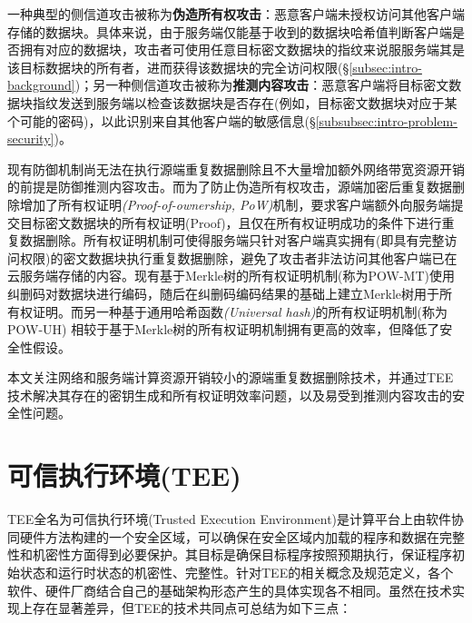 一种典型的侧信道攻击被称为\textbf{伪造所有权攻击}：恶意客户端未授权访问其他客户端存储的数据块\cite{harnik2010side,mulazzani11}。具体来说，由于服务端仅能基于收到的数据块哈希值判断客户端是否拥有对应的数据块，攻击者可使用任意目标密文数据块的指纹来说服服务端其是该目标数据块的所有者，进而获得该数据块的完全访问权限(\S\ref{subsec:intro-background})；另一种侧信道攻击被称为\textbf{推测内容攻击}：恶意客户端将目标密文数据块指纹发送到服务端以检查该数据块是否存在(例如，目标密文数据块对应于某个可能的密码\cite{harnik2010side})，以此识别来自其他客户端的敏感信息(\S\ref{subsubsec:intro-problem-security})。

现有防御机制尚无法在执行源端重复数据删除且不大量增加额外网络带宽资源开销的前提是防御推测内容攻击。而为了防止伪造所有权攻击，源端加密后重复数据删除增加了所有权证明\textit{(Proof-of-ownership, PoW)}机制\cite{halevi11}，要求客户端额外向服务端提交目标密文数据块的所有权证明(Proof)，且仅在所有权证明成功的条件下进行重复数据删除。所有权证明机制可使得服务端只针对客户端真实拥有(即具有完整访问权限)的密文数据块执行重复数据删除，避免了攻击者非法访问其他客户端已在云服务端存储的内容。现有基于Merkle树的所有权证明机制(称为POW-MT)\cite{xu2013weak}使用纠删码对数据块进行编码，随后在纠删码编码结果的基础上建立Merkle树用于所有权证明。而另一种基于通用哈希函数\textit{(Universal hash)}的所有权证明机制(称为POW-UH)\cite{halevi2011proofs} 相较于基于Merkle树的所有权证明机制拥有更高的效率，但降低了安全性假设。

本文关注网络和服务端计算资源开销较小的源端重复数据删除技术，并通过TEE技术解决其存在的密钥生成和所有权证明效率问题，以及易受到推测内容攻击的安全性问题。

\section{可信执行环境(TEE)}
\label{sec:background-tee}

TEE全名为可信执行环境(Trusted Execution Environment)是计算平台上由软件协同硬件方法构建的一个安全区域，可以确保在安全区域内加载的程序和数据在完整性和机密性方面得到必要保护。其目标是确保目标程序按照预期执行，保证程序初始状态和运行时状态的机密性、完整性。针对TEE的相关概念及规范定义，各个软件、硬件厂商结合自己的基础架构形态产生的具体实现各不相同。虽然在技术实现上存在显著差异，但TEE的技术共同点可总结为如下三点：

